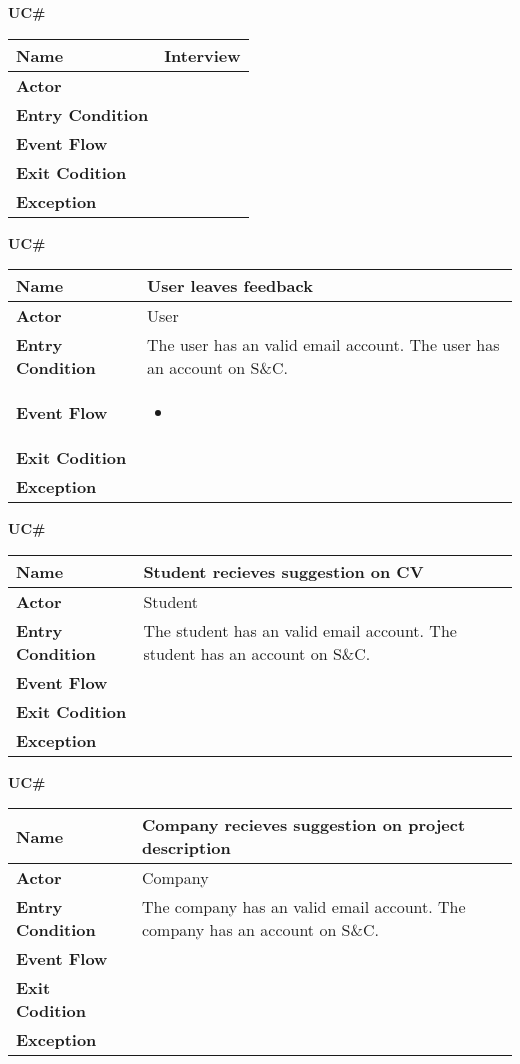 \textbf{UC\#}

\begin{longtable}{|p{}|p{}|}
\hline
\textbf{Name} &  Interview\\
\hline
\textbf{Actor} &  \\
\hline
\textbf{Entry Condition} &  \\
\hline
\textbf{Event Flow} &  \\
\hline
\textbf{Exit Codition} &  \\
\hline
\textbf{Exception} &  \\
\hline
\end{longtable}



\textbf{UC\#}

\begin{longtable}{|p{}|p{}|}
\hline
\textbf{Name} &  User leaves feedback\\
\hline
\textbf{Actor} &  User\\
\hline
\textbf{Entry Condition} &  The user has an valid email account. The user has an account on S\&C.\\
\hline
\textbf{Event Flow} &  
\begin{itemize}
    \item 
\end{itemize}\\
\hline
\textbf{Exit Codition} &  \\
\hline
\textbf{Exception} &  \\
\hline
\end{longtable}



\textbf{UC\#}

\begin{longtable}{|p{}|p{}|}
\hline
\textbf{Name} &  Student recieves suggestion on CV\\
\hline
\textbf{Actor} &  Student\\
\hline
\textbf{Entry Condition} &  The student has an valid email account. The student has an account on S\&C.\\
\hline
\textbf{Event Flow} &  \\
\hline
\textbf{Exit Codition} &  \\
\hline
\textbf{Exception} &  \\
\hline
\end{longtable}

\textbf{UC\#}

\begin{longtable}{|p{}|p{}|}
\hline
\textbf{Name} &  Company recieves suggestion on project description\\
\hline
\textbf{Actor} &  Company\\
\hline
\textbf{Entry Condition} &  The company has an valid email account. The company has an account on S\&C.\\
\hline
\textbf{Event Flow} &  \\
\hline
\textbf{Exit Codition} &  \\
\hline
\textbf{Exception} &  \\
\hline
\end{longtable}

